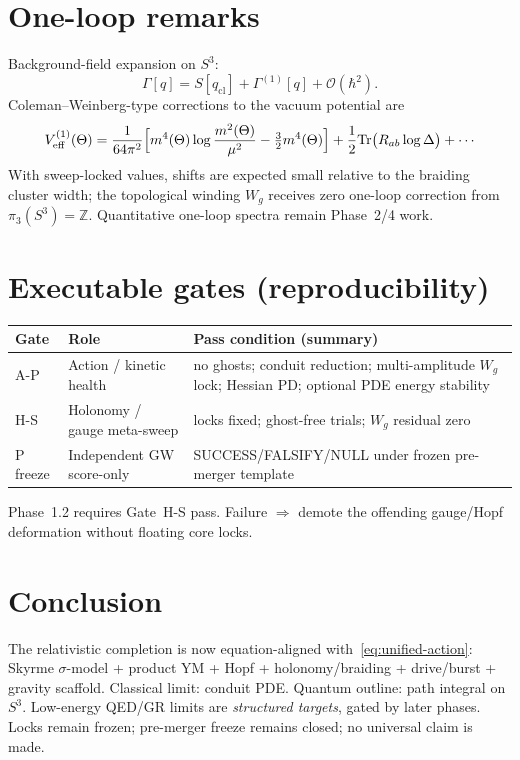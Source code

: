 \documentclass[11pt]{article}
\begin{document}
\section{One-loop remarks}
\label{sec:oneloop}

Background-field expansion on $S^3$:
\[
\Gamma[q]=S[q_{\mathrm{cl}}]+\Gamma^{(1)}[q]+\mathcal{O}(\hbar^2).
\]
Coleman--Weinberg-type corrections to the vacuum potential are
\begin{equation}
V_{\mathrm{eff}}^{(1)}(\Theta)
=\frac{1}{64\pi^2}\Bigl[
m^4(\Theta)\log\frac{m^2(\Theta)}{\mu^2}-\tfrac{3}{2}m^4(\Theta)
\Bigr]
+\frac{1}{2}\mathrm{Tr}\bigl(R_{ab}\log\Delta\bigr)+\cdots
\label{eq:cw}
\end{equation}
With sweep-locked values, shifts are expected small relative to the braiding cluster width;
the topological winding $W_g$ receives zero one-loop correction from $\pi_3(S^3)=\mathbb{Z}$.
Quantitative one-loop spectra remain Phase~2/4 work.

\section{Executable gates (reproducibility)}

\begin{center}
\begin{tabular}{@{}llp{}@{}}
\hline
Gate & Role & Pass condition (summary) \\
\hline
A-P & Action / kinetic health & no ghosts; conduit reduction; multi-amplitude $W_g$ lock;
  Hessian PD; optional PDE energy stability \\
H-S & Holonomy / gauge meta-sweep & locks fixed; ghost-free trials; $W_g$ residual zero \\
P freeze & Independent GW score-only & SUCCESS/FALSIFY/NULL under frozen pre-merger template \\
\hline
\end{tabular}
\end{center}

Phase~1.2 requires Gate~H-S pass. Failure $\Rightarrow$ demote the offending
gauge/Hopf deformation without floating core locks.

\section{Conclusion}

The relativistic completion is now equation-aligned with~\eqref{eq:unified-action}:
Skyrme $\sigma$-model + product YM + Hopf + holonomy/braiding + drive/burst + gravity
scaffold. Classical limit: conduit PDE. Quantum outline: path integral on $S^3$.
Low-energy QED/GR limits are \emph{structured targets}, gated by later phases.
Locks remain frozen; pre-merger freeze remains closed; no universal claim is made.
\end{document}
